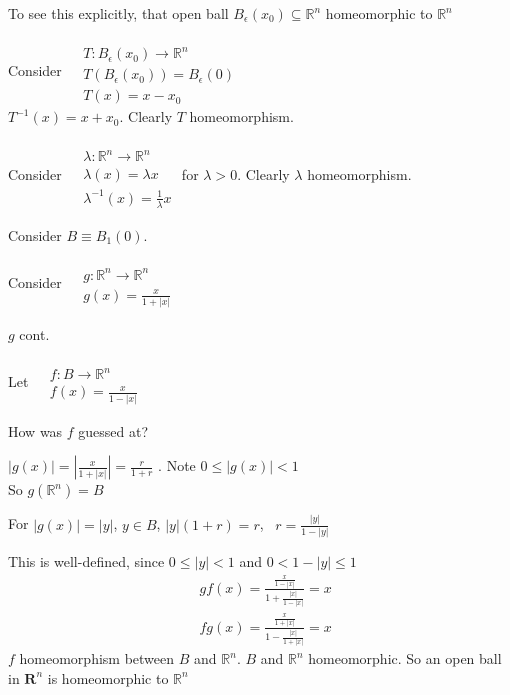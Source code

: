 To see this explicitly, that open ball $B_{\epsilon}(x_0) \subseteq \mathbb{R}^n $ homeomorphic to $\mathbb{R}^n$

Consider $\begin{aligned} & \quad \\ 
  & T: B_{\epsilon}(x_0) \to \mathbb{R}^n \\ 
  & T(B_{\epsilon}(x_0)) = B_{\epsilon}(0) \\ 
  & T(x) = x- x_0 \end{aligned}$  \\
$T^{-1}(x) = x+x_0$.  Clearly $T$ homeomorphism.  

Consider $\begin{aligned} & \quad \\
& \lambda : \mathbb{R}^n \to \mathbb{R}^n \\
  & \lambda(x) = \lambda x \\
  & \lambda^{-1}(x) = \frac{1}{ \lambda } x \end{aligned}$ for $\lambda >0$.  Clearly $\lambda$ homeomorphism.  

Consider $B \equiv B_1(0)$.  

Consider $\begin{aligned} & \quad \\ 
  & g: \mathbb{R}^n \to \mathbb{R}^n \\
  & g(x) = \frac{x}{ 1 + |x| } \end{aligned}$ 

$g$ cont.  

Let $\begin{aligned} & \quad \\
  & f:B \to \mathbb{R}^n \\
  & f(x) = \frac{x}{ 1 - |x| } \end{aligned} $ 

How was $f$ guessed at?

$|g(x) | = \left| \frac{x}{1 + |x| } \right| = \frac{r}{ 1 + r}$ .  Note $0 \leq |g(x) | <1$ \\
So $g(\mathbb{R}^n) = B$

For $|g(x)| = |y|$, $y \in B$, $|y|(1+r) = r$, \, $r = \frac{ |y| }{ 1 - |y| }$

This is well-defined, since $0 \leq |y| < 1$ and $0 < 1 - |y| \leq 1$
\[
\begin{aligned}
  & gf(x) =\frac{  \frac{ x}{ 1 - |x| } }{ 1 + \frac{|x|}{ 1 - |x| } } = x \\ 
  & fg(x) = \frac{ \frac{x}{ 1 + |x| } }{ 1 - \frac{|x| }{ 1 + |x| } } = x
\end{aligned}
\]
$f$ homeomorphism between $B$ and $\mathbb{R}^n$.  $B$ and $\mathbb{R}^n$ homeomorphic.  So an open ball in $\mathbf{R}^n$ is homeomorphic to $\mathbb{R}^n$

